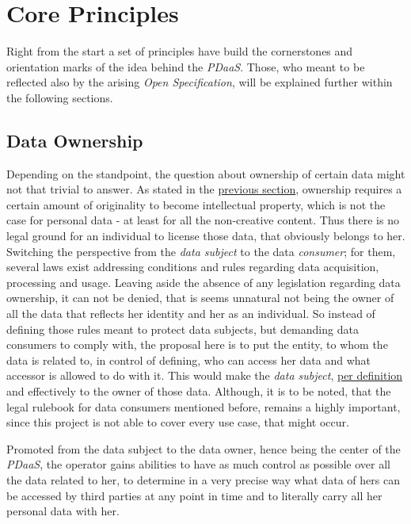 \documentclass[12pt,english,a4paper,titlepage,cleardoublepage=empty,dottedtoc]{report}
\begin{document}
\hypertarget{core-principles}{\chapter{Core
Principles}\label{core-principles}}

Right from the start a set of principles have build the cornerstones and
orientation marks of the idea behind the \emph{PDaaS}. Those, who meant
to be reflected also by the arising \emph{Open Specification}, will be
explained further within the following sections.

\section{Data Ownership}\label{data-ownership}

Depending on the standpoint, the question about ownership of certain
data might not that trivial to answer. As stated in the
\protect\hyperlink{digital-identity-personal-data-and-ownership}{previous
section}, ownership requires a certain amount of originality to become
intellectual property, which is not the case for personal data - at
least for all the non-creative content. Thus there is no legal ground
for an individual to license those data, that obviously belongs to her.
Switching the perspective from the \emph{data subject} to the data
\emph{consumer}; for them, several laws exist addressing conditions and
rules regarding data acquisition, processing and usage. Leaving aside
the absence of any legislation regarding data ownership, it can not be
denied, that is seems unnatural not being the owner of all the data that
reflects her identity and her as an individual. So instead of defining
those rules meant to protect data subjects, but demanding data consumers
to comply with, the proposal here is to put the entity, to whom the data
is related to, in control of defining, who can access her data and what
accessor is allowed to do with it. This would make the \emph{data
subject}, \protect\hyperlink{def-ownership}{per definition} and
effectively to the owner of those data. Although, it is to be noted,
that the legal rulebook for data consumers mentioned before, remains a
highly important, since this project is not able to cover every use
case, that might occur.

Promoted from the data subject to the data owner, hence being the center
of the \emph{PDaaS}, the operator gains abilities to have as much
control as possible over all the data related to her, to determine in a
very precise way what data of hers can be accessed by third parties at
any point in time and to literally carry all her personal data with her.
\end{document}
